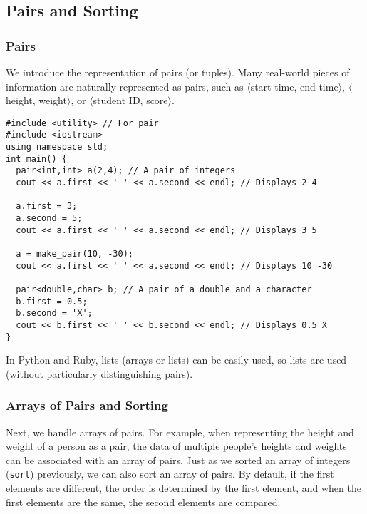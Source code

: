 \subsection{Pairs and Sorting}\label{section:sort-pairs}
\subsubsection{Pairs}
We introduce the representation of pairs (or tuples). Many real-world pieces of information are naturally represented as pairs, such as $\langle$start time, end time$\rangle$, $\langle$height, weight$\rangle$, or $\langle$student ID, score$\rangle$.

\begin{cbox}
\begin{verbatim}
#include <utility> // For pair
#include <iostream>
using namespace std;
int main() {
  pair<int,int> a(2,4); // A pair of integers
  cout << a.first << ' ' << a.second << endl; // Displays 2 4

  a.first = 3;
  a.second = 5;
  cout << a.first << ' ' << a.second << endl; // Displays 3 5

  a = make_pair(10, -30);
  cout << a.first << ' ' << a.second << endl; // Displays 10 -30

  pair<double,char> b; // A pair of a double and a character
  b.first = 0.5;
  b.second = 'X';
  cout << b.first << ' ' << b.second << endl; // Displays 0.5 X
}
\end{verbatim}
\end{cbox}

In Python and Ruby, lists (arrays or lists) can be easily used, so lists are used (without particularly distinguishing pairs).

\subsubsection{Arrays of Pairs and Sorting}
Next, we handle arrays of pairs. For example, when representing the height and weight of a person as a pair, the data of multiple people's heights and weights can be associated with an array of pairs.
Just as we sorted an array of integers (\texttt{sort}) previously, we can also sort an array of pairs.
By default, if the first elements are different, the order is determined by the first element, and when the first elements are the same, the second elements are compared.

